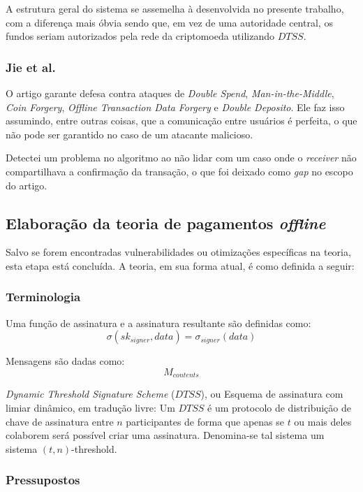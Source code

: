\documentclass[
  12pt,
  a4paper,
  oneside,
  article,
]{abntex2}
\begin{document}
A estrutura geral do sistema se assemelha à desenvolvida no presente trabalho, com a diferença mais óbvia sendo que, em vez de uma autoridade central, os fundos seriam autorizados pela rede da criptomoeda utilizando $DTSS$.

\subsubsection{Jie et al.}

O artigo garante defesa contra ataques de \textit{Double Spend}, \textit{Man-in-the-Middle}, \textit{Coin Forgery}, \textit{Offline Transaction Data Forgery} e \textit{Double Deposito}. Ele faz isso assumindo, entre outras coisas, que a comunicação entre usuários é perfeita, o que não pode ser garantido no caso de um atacante malicioso.

Detectei um problema no algoritmo ao não lidar com um caso onde o \textit{receiver} não compartilhava a confirmação da transação, o que foi deixado como \textit{gap} no escopo do artigo.

\subsection{Elaboração da teoria de pagamentos \textit{offline}}

Salvo se forem encontradas vulnerabilidades ou otimizações específicas na teoria, esta etapa está concluída. A teoria, em sua forma atual, é como definida a seguir:

\subsubsection{Terminologia}

Uma função de assinatura e a assinatura resultante são definidas como:
$$\sigma(sk_{signer}, data) = \sigma_{signer}(data)$$

Mensagens são dadas como:
$$ M_{contents} $$

\textit{Dynamic Threshold Signature Scheme} ($DTSS$), ou Esquema de assinatura com limiar dinâmico, em tradução livre:
Um $DTSS$ é um protocolo de distribuição de chave de assinatura entre $n$ participantes de forma que apenas se $t$ ou mais deles colaborem será possível criar uma assinatura. Denomina-se tal sistema um sistema $(t, n)$-threshold.

\subsubsection{Pressupostos}
\end{document}
